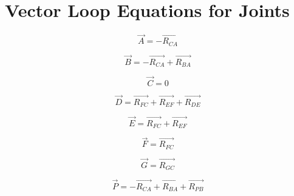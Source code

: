 \documentclass[hidelinks]{article}
\begin{document}
    \FloatBarrier\section*{Vector Loop Equations for Joints}
    \begin{equation}
        \label{eq:point_a}
        \vec{A}=-\vec{R_{CA}}
    \end{equation}

    \begin{equation}
        \label{eq:point_b}
        \vec{B}=-\vec{R_{CA}}+\vec{R_{BA}}
    \end{equation}

    \begin{equation}
        \label{eq:point_c}
        \vec{C}=0
    \end{equation}

    \begin{equation}
        \label{eq:point_d}
        \vec{D}=\vec{R_{FC}}+\vec{R_{EF}}+\vec{R_{DE}}
    \end{equation}

    \begin{equation}
        \label{eq:point_e}
        \vec{E}=\vec{R_{FC}}+\vec{R_{EF}}
    \end{equation}

    \begin{equation}
        \label{eq:point_f}
        \vec{F}=\vec{R_{FC}}
    \end{equation}

    \begin{equation}
        \label{eq:point_g}
        \vec{G}=\vec{R_{GC}}
    \end{equation}

    \begin{equation}
        \label{eq:bucket_point}
        \vec{P}=-\vec{R_{CA}}+\vec{R_{BA}}+\vec{R_{PB}}
    \end{equation}
\end{document}
